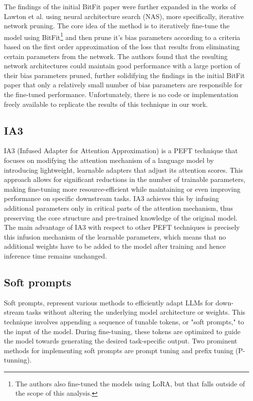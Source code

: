 \documentclass[fleqn,moreauthors,10pt]{ds_report}
\begin{document}
The findings of the initial BitFit paper were further expanded in the works of Lawton et al.\cite{us-bitfit} using neural architecture search (NAS), more specifically, iterative network pruning. The core idea of the method is to iteratively fine-tune the model using BitFit\footnote{The authors also fine-tuned the models using LoRA, but that falls outside of the scope of this analysis.} and then prune it's bias parameters according to a criteria based on the first order approximation of the loss that results from eliminating certain parameters from the network. The authors found that the resulting network architectures could maintain good performance with a large portion of their bias parameters pruned, further solidifying the findings in the initial BitFit paper that only a relatively small number of bias parameters are responsible for the fine-tuned performance. Unfortunately, there is no code or implementation freely available to replicate the results of this technique in our work.

\subsection* {IA3}

IA3 (Infused Adapter for Attention Approximation) \cite{ia3} is a PEFT technique that focuses on modifying the attention mechanism of a language model by introducing lightweight, learnable adapters that adjust its attention scores. This approach allows for significant reductions in the number of trainable parameters, making fine-tuning more resource-efficient while maintaining or even improving performance on specific downstream tasks. IA3 achieves this by infusing additional parameters only in critical parts of the attention mechanism, thus preserving the core structure and pre-trained knowledge of the original model. The main advantage of IA3 with respect to other PEFT techniques is precisely this infusion mechanism of the learnable parameters, which means that no additional weights have to be added to the model after training and hence inference time remains unchanged.

\subsection*{Soft prompts}
Soft prompts, represent various methods to efficiently adapt LLMs for down-stream tasks without altering the underlying model architecture or weights. This technique involves appending a sequence of tunable tokens, or "soft prompts," to the input of the model. During fine-tuning, these tokens are optimized to guide the model towards generating the desired task-specific output. Two prominent methods for implementing soft prompts are prompt tuning and prefix tuning (P-tunning). 
\end{document}

